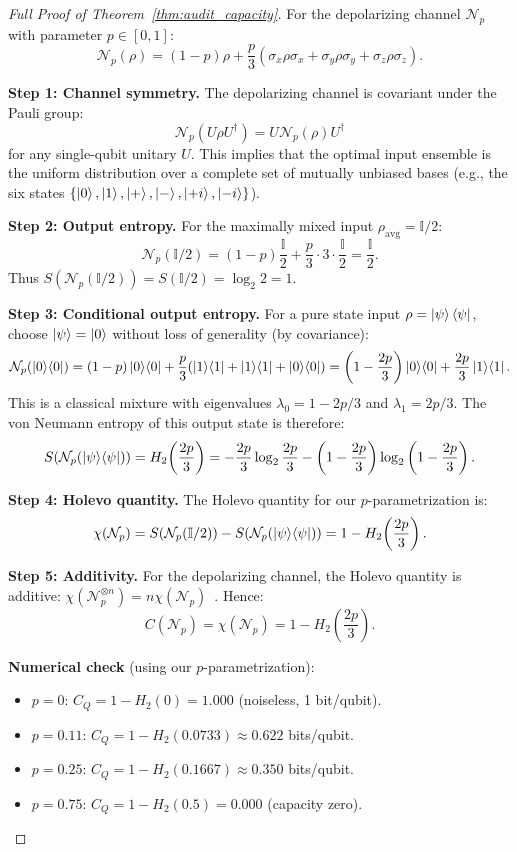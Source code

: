 \documentclass[11pt,a4paper]{article}
\theoremstyle{plain}
\theoremstyle{definition}
\theoremstyle{remark}
\newcommand{\cN}{\mathcal{N}}
\newcommand{\id}{\mathbb{I}}
\newcommand{\ketbra}[2]{\ket{#1}\!\bra{#2}}
\newcommand{\pauliX}{\sigma_x}
\newcommand{\pauliY}{\sigma_y}
\newcommand{\pauliZ}{\sigma_z}
\begin{document}
\begin{proof}[Full Proof of Theorem~\ref{thm:audit_capacity}]
For the depolarizing channel $\cN_p$ with parameter $p \in [0, 1]$:
\[
\cN_p(\rho) = (1-p)\rho + \frac{p}{3}(\pauliX\rho\pauliX
+ \pauliY\rho\pauliY + \pauliZ\rho\pauliZ).
\]

\textbf{Step 1: Channel symmetry.} The depolarizing channel is
covariant under the Pauli group:
\[
\cN_p(U\rho U^\dagger) = U \cN_p(\rho) U^\dagger
\]
for any single-qubit unitary $U$. This implies that the optimal input
ensemble is the uniform distribution over a complete set of mutually
unbiased bases (e.g., the six states $\{\ket{0},\ket{1},\ket{+},\ket{-},
\ket{+i},\ket{-i}\}$).

\textbf{Step 2: Output entropy.} For the maximally mixed input
$\rho_{\text{avg}} = \id/2$:
\[
\cN_p(\id/2) = (1-p)\frac{\id}{2} + \frac{p}{3} \cdot 3 \cdot \frac{\id}{2}
= \frac{\id}{2}.
\]
Thus $S(\cN_p(\id/2)) = S(\id/2) = \log_2 2 = 1$.

\textbf{Step 3: Conditional output entropy.} For a pure state input
$\rho = \ket{\psi}\bra{\psi}$, choose $\ket{\psi} = \ket{0}$ without
loss of generality (by covariance):
\[
\cN_p(\ketbra{0}{0}) = (1-p)\ketbra{0}{0} +
\frac{p}{3}(\ketbra{1}{1} + \ketbra{1}{1} + \ketbra{0}{0})
= \left(1 - \frac{2p}{3}\right)\ketbra{0}{0} +
\frac{2p}{3}\ketbra{1}{1}.
\]
This is a classical mixture with eigenvalues
$\lambda_0 = 1 - 2p/3$ and $\lambda_1 = 2p/3$.
The von Neumann entropy of this output state is therefore:
\[
S(\cN_p(\ketbra{\psi}{\psi})) = H_2\!\left(\frac{2p}{3}\right)
= -\frac{2p}{3}\log_2\frac{2p}{3} - \left(1-\frac{2p}{3}\right)\log_2\left(1-\frac{2p}{3}\right).
\]

\textbf{Step 4: Holevo quantity.} The Holevo quantity for our $p$-parametrization is:
\[
\chi(\cN_p) = S(\cN_p(\id/2)) - S(\cN_p(\ketbra{\psi}{\psi}))
= 1 - H_2\!\left(\frac{2p}{3}\right).
\]

\textbf{Step 5: Additivity.} For the depolarizing channel, the
Holevo quantity is additive:
$\chi(\cN_p^{\otimes n}) = n\chi(\cN_p)$~\cite{king2003}. Hence:
\[
C(\cN_p) = \chi(\cN_p) = 1 - H_2\!\left(\frac{2p}{3}\right).
\]

\textbf{Numerical check} (using our $p$-parametrization):
\begin{itemize}
  \item $p = 0$: $C_Q = 1 - H_2(0) = 1.000$ (noiseless, 1 bit/qubit).
  \item $p = 0.11$: $C_Q = 1 - H_2(0.0733) \approx 0.622$ bits/qubit.
  \item $p = 0.25$: $C_Q = 1 - H_2(0.1667) \approx 0.350$ bits/qubit.
  \item $p = 0.75$: $C_Q = 1 - H_2(0.5) = 0.000$ (capacity zero).
\end{itemize}
\end{proof}
\end{document}
